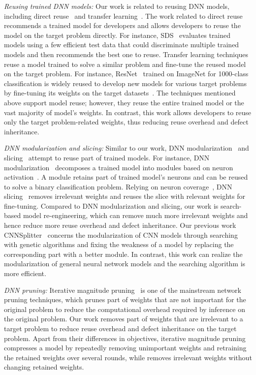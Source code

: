 \textit{Reusing trained DNN models:} 
Our work is related to reusing DNN models, including direct reuse~\cite{icse21discriminiate, ji2018model} and transfer learning~\cite{transfer_nips,guo2019spottune}.
The work related to direct reuse recommends a trained model for developers and allows developers to reuse the model on the target problem directly.
For instance, SDS~\cite{icse21discriminiate} evaluates trained models using a few efficient test data that could discriminate multiple trained models and then recommends the best one to reuse.
Transfer learning techniques reuse a model trained to solve a similar problem and fine-tune the reused model on the target problem.
For instance, ResNet~\cite{resnet} trained on ImageNet for 1000-class classification is widely reused to develop new models for various target problems by fine-tuning its weights on the target datasets~\cite{kornblith2019better,guo2019spottune}.
The techniques mentioned above support model reuse; however, they reuse the entire trained model or the vast majority of model's weights.
In contrast, this work allows developers to reuse only the target problem-related weights, thus reducing reuse overhead and defect inheritance.

\textit{DNN modularization and slicing:}
Similar to our work, DNN modularization~\cite{nnmodularity2022icse, fse2020modularity} and slicing~\cite{ReMos} attempt to reuse part of trained models. 
For instance, DNN modularization~\cite{nnmodularity2022icse, fse2020modularity} decomposes a trained model into modules based on neuron activation~\cite{neuron_activation,li2019structural}. A module retains part of trained model's neurons and can be reused to solve a binary classification problem.
Relying on neuron coverage~\cite{neuron_activation,li2019structural}, DNN slicing~\cite{ReMos} removes irrelevant weights and reuses the slice with relevant weights for fine-tuning. 
Compared to DNN modularization and slicing, our work is search-based model re-engineering, which can remove much more irrelevant weights and hence reduce more reuse overhead and defect inheritance. Our previous work CNNSplitter~\cite{qi2022patching} concerns the modularization of CNN models through searching with genetic algorithms and fixing the weakness of a model by replacing the corresponding part with a better module. In contrast, this work can realize the modularization of general neural network models and the searching algorithm is more efficient.

\textit{DNN pruning:}
Iterative magnitude pruning~\cite{pruning_hansong, lottery, rosenfeld2021predictability} is one of the mainstream network pruning techniques, which prunes part of weights that are not important for the original problem to reduce the computational overhead required by inference on the original problem.
Our work removes part of weights that are irrelevant to a target problem to reduce reuse overhead and defect inheritance on the target problem.
Apart from their differences in objectives, iterative magnitude pruning compresses a model by repeatedly removing unimportant weights and retraining the retained weights over several rounds, while \projectName removes irrelevant weights without changing retained weights.

